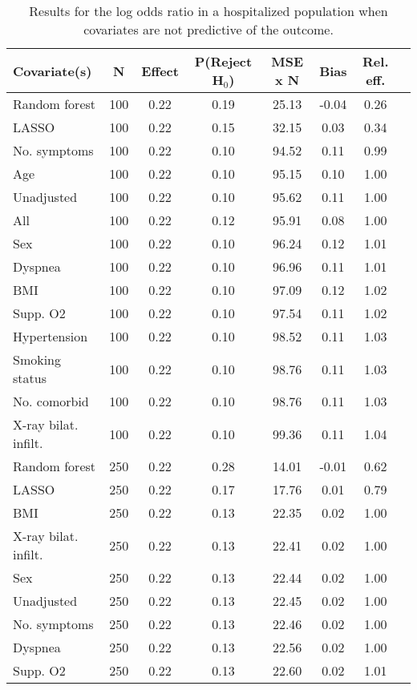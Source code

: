 \documentclass{article}
\begin{document}
\clearpage

{\tabcolsep=6pt  %
\begin{longtable}{lccccccc}
\caption{Results for the log odds ratio in a hospitalized population when covariates are not predictive of the outcome.} \\
Covariate(s) & N & Effect & P(Reject H$_0$) & MSE x N & Bias & Rel. eff.\\ \midrule
Random forest & 100 & 0.22 & 0.19 & 25.13 & -0.04 & 0.26 \\ 
LASSO & 100 & 0.22 & 0.15 & 32.15 &  0.03 & 0.34 \\ 
No. symptoms & 100 & 0.22 & 0.10 & 94.52 &  0.11 & 0.99 \\ 
Age & 100 & 0.22 & 0.10 & 95.15 &  0.10 & 1.00 \\ 
Unadjusted & 100 & 0.22 & 0.10 & 95.62 &  0.11 & 1.00 \\ 
All & 100 & 0.22 & 0.12 & 95.91 &  0.08 & 1.00 \\ 
Sex & 100 & 0.22 & 0.10 & 96.24 &  0.12 & 1.01 \\ 
Dyspnea & 100 & 0.22 & 0.10 & 96.96 &  0.11 & 1.01 \\ 
BMI & 100 & 0.22 & 0.10 & 97.09 &  0.12 & 1.02 \\ 
Supp. O2 & 100 & 0.22 & 0.10 & 97.54 &  0.11 & 1.02 \\ 
Hypertension & 100 & 0.22 & 0.10 & 98.52 &  0.11 & 1.03 \\ 
Smoking status & 100 & 0.22 & 0.10 & 98.76 &  0.11 & 1.03 \\ 
No. comorbid & 100 & 0.22 & 0.10 & 98.76 &  0.11 & 1.03 \\ 
X-ray bilat. infilt. & 100 & 0.22 & 0.10 & 99.36 &  0.11 & 1.04 \\ \midrule() 
Random forest & 250 & 0.22 & 0.28 & 14.01 & -0.01 & 0.62 \\ 
LASSO & 250 & 0.22 & 0.17 & 17.76 &  0.01 & 0.79 \\ 
BMI & 250 & 0.22 & 0.13 & 22.35 &  0.02 & 1.00 \\ 
X-ray bilat. infilt. & 250 & 0.22 & 0.13 & 22.41 &  0.02 & 1.00 \\ 
Sex & 250 & 0.22 & 0.13 & 22.44 &  0.02 & 1.00 \\ 
Unadjusted & 250 & 0.22 & 0.13 & 22.45 &  0.02 & 1.00 \\ 
No. symptoms & 250 & 0.22 & 0.13 & 22.46 &  0.02 & 1.00 \\ 
Dyspnea & 250 & 0.22 & 0.13 & 22.56 &  0.02 & 1.00 \\ 
Supp. O2 & 250 & 0.22 & 0.13 & 22.60 &  0.02 & 1.01 \\ 

\end{longtable}}
\end{document}
